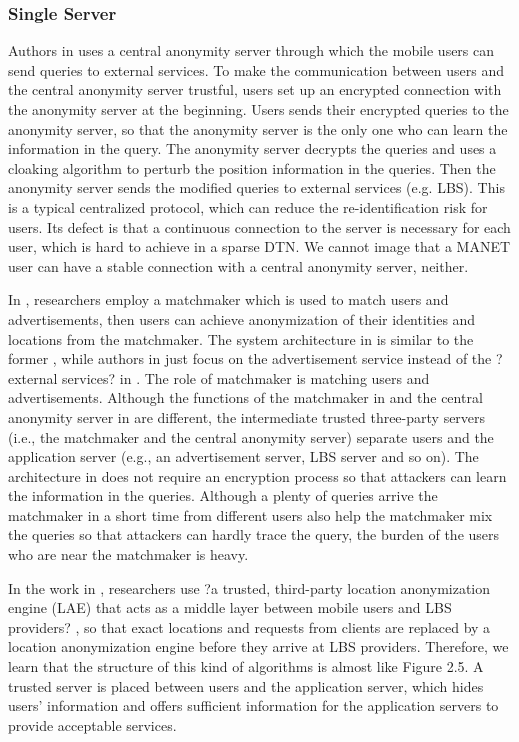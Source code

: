 \subsubsection{ Single Server}

\noindent Authors in \cite {C15} uses a central anonymity server through which the mobile users can send queries to external services. To make the communication between users and the central anonymity server trustful, users set up an encrypted connection with the anonymity server at the beginning. Users sends their encrypted queries to the anonymity server, so that the anonymity server is the only one who can learn the information in the query. The anonymity server decrypts the queries and uses a cloaking algorithm to perturb the position information in the queries. Then the anonymity server sends the modified queries to external services (e.g. LBS). This is a typical centralized protocol, which can reduce the re-identification risk for users. Its defect is that a continuous connection to the server is necessary for each user, which is hard to achieve in a sparse DTN. We cannot image that a MANET user can have a stable connection with a central anonymity server, neither.

In \cite {C23}, researchers employ a matchmaker which is used to match users and advertisements, then users can achieve anonymization of their identities and locations from the matchmaker. The system architecture in \cite {C23} is similar to the former \cite {C}, while authors in \cite {C23} just focus on the advertisement service instead of the ?external services? in \cite {C23}. The role of matchmaker is matching users and advertisements. Although the functions of the matchmaker in \cite {C23} and the central anonymity server in \cite {C15} are different, the intermediate trusted three-party servers (i.e., the matchmaker and the central anonymity server) separate users and the application server (e.g., an advertisement server, LBS server and so on). The architecture in \cite {C23} does not require an encryption process so that attackers can learn the information in the queries. Although a plenty of queries arrive the matchmaker in a short time from different users also help the matchmaker mix the queries so that attackers can hardly trace the query, the burden of the users who are near the matchmaker is heavy.

In the work in \cite {C24}, researchers use ?a trusted, third-party location anonymization engine (LAE) that acts as a middle layer between mobile users and LBS providers? \cite {C24}, so that exact locations and requests from clients are replaced by a location anonymization engine before they arrive at LBS providers. Therefore, we learn that the structure of this kind of algorithms is almost like Figure 2.5. A trusted server is placed between users and the application server, which hides users' information and offers sufficient information for the application servers to provide acceptable services. 


